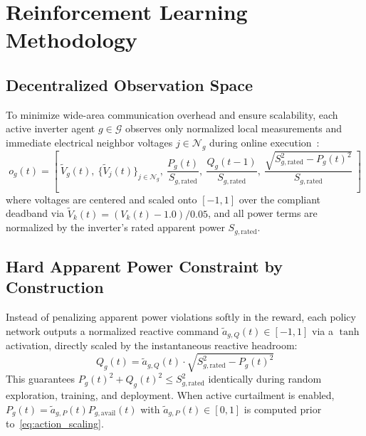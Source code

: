 \chapter{Reinforcement Learning Methodology}
\label{ch:rl_methodology}

\section{Decentralized Observation Space}
To minimize wide-area communication overhead and ensure scalability, each active inverter agent $g \in \mathcal{G}$ observes only normalized local measurements and immediate electrical neighbor voltages $j \in \mathcal{N}_g$ during online execution~\cite{Ortmann2020,Jacob2024}:
\begin{equation}
    o_g(t) = \left[\ \tilde{V}_g(t),\ \{\tilde{V}_j(t)\}_{j \in \mathcal{N}_g},\ \frac{P_g(t)}{S_{g,\text{rated}}},\ \frac{Q_g(t-1)}{S_{g,\text{rated}}},\ \frac{\sqrt{S_{g,\text{rated}}^2 - P_g(t)^2}}{S_{g,\text{rated}}}\ \right]
    \label{eq:obs_vector}
\end{equation}
where voltages are centered and scaled onto $[-1, 1]$ over the compliant deadband via $\tilde{V}_k(t) = (V_k(t) - 1.0) / 0.05$, and all power terms are normalized by the inverter's rated apparent power $S_{g,\text{rated}}$.

\section{Hard Apparent Power Constraint by Construction}
Instead of penalizing apparent power violations softly in the reward, each policy network outputs a normalized reactive command $\tilde{a}_{g,Q}(t) \in [-1, 1]$ via a $\tanh$ activation, directly scaled by the instantaneous reactive headroom:
\begin{equation}
    Q_g(t) = \tilde{a}_{g,Q}(t) \cdot \sqrt{S_{g,\text{rated}}^2 - P_g(t)^2}
    \label{eq:action_scaling}
\end{equation}
This guarantees $P_g(t)^2 + Q_g(t)^2 \le S_{g,\text{rated}}^2$ identically during random exploration, training, and deployment. When active curtailment is enabled, $P_g(t) = \tilde{a}_{g,P}(t) P_{g,\text{avail}}(t)$ with $\tilde{a}_{g,P}(t) \in [0, 1]$ is computed prior to~\eqref{eq:action_scaling}.

